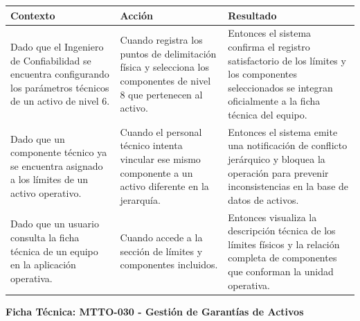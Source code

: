 \footnotesize\begin{longtable}{|p{0.28\textwidth}|p{0.32\textwidth}|p{0.34\textwidth}|}\hline
\textbf{Contexto} & \textbf{Acción} & \textbf{Resultado} \\ \hline
\parbox[t]{\linewidth}{Dado que el Ingeniero de Confiabilidad se encuentra configurando los parámetros técnicos de un activo de nivel 6.} & \parbox[t]{\linewidth}{Cuando registra los puntos de delimitación física y selecciona los componentes de nivel 8 que pertenecen al activo.} & \parbox[t]{\linewidth}{Entonces el sistema confirma el registro satisfactorio de los límites y los componentes seleccionados se integran oficialmente a la ficha técnica del equipo.} \\ \hline
\parbox[t]{\linewidth}{Dado que un componente técnico ya se encuentra asignado a los límites de un activo operativo.} & \parbox[t]{\linewidth}{Cuando el personal técnico intenta vincular ese mismo componente a un activo diferente en la jerarquía.} & \parbox[t]{\linewidth}{Entonces el sistema emite una notificación de conflicto jerárquico y bloquea la operación para prevenir inconsistencias en la base de datos de activos.} \\ \hline
\parbox[t]{\linewidth}{Dado que un usuario consulta la ficha técnica de un equipo en la aplicación operativa.} & \parbox[t]{\linewidth}{Cuando accede a la sección de límites y componentes incluidos.} & \parbox[t]{\linewidth}{Entonces visualiza la descripción técnica de los límites físicos y la relación completa de componentes que conforman la unidad operativa.} \\ \hline
\end{longtable}\normalsize
\vspace{1em}
\noindent\textbf{Ficha Técnica: MTTO-030 - Gestión de Garantías de Activos}
\footnotesize\setlength{\tabcolsep}{4pt}\renewcommand{\arraystretch}{1.2}
